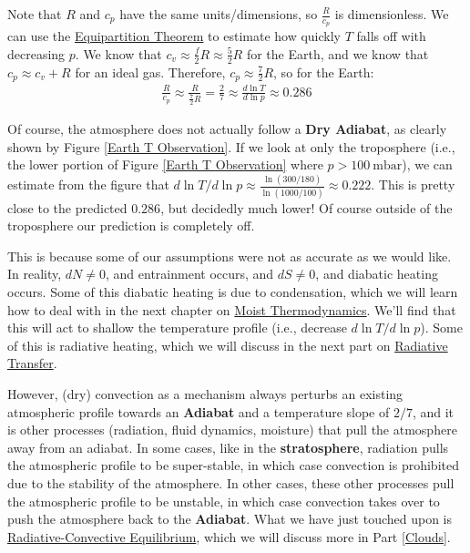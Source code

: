 Note that $R$ and $c_p$ have the same units/dimensions, so $\frac{R}{c_p}$ is dimensionless. We can use the \hyperref[Equipartition]{Equipartition Theorem} to estimate how quickly $T$ falls off with decreasing $p$. We know that $c_v\approx \frac{f}{2}R\approx\frac{5}{2}R$ for the Earth, and we know that $c_p\approx c_v+R$ for an ideal gas. Therefore, $c_p\approx \frac{7}{2}R$, so for the Earth:
\begin{align*}
    \frac{R}{c_p}\approx\frac{R}{\frac{7}{2}R}=\frac{2}{7}\approx\frac{d \ln T}{d \ln p}\approx0.286
\end{align*}

Of course, the atmosphere does not actually follow a \textbf{Dry Adiabat}, as clearly shown by Figure \ref{Earth T Observation}. If we look at only the troposphere (i.e., the lower portion of Figure \ref{Earth T Observation} where $p>\qty{100}{\milli\bar}$), we can estimate from the figure that $d\ln T/d\ln p\approx \frac{\ln(300/180)}{\ln(1000/100)}\approx 0.222$. This is pretty close to the predicted $0.286$, but decidedly much lower! Of course outside of the troposphere our prediction is completely off.

This is because some of our assumptions were not as accurate as we would like. In reality, $dN\neq0$, and entrainment occurs, and $dS\neq0$, and diabatic heating occurs. Some of this diabatic heating is due to condensation, which we will learn how to deal with in the next chapter on \hyperref[Moist Thermodynamics]{Moist Thermodynamics}. We'll find that this will act to shallow the temperature profile (i.e., decrease $d\ln T/d\ln p$). Some of this is radiative heating, which we will discuss in the next part on \hyperref[Radiative Transfer]{Radiative Transfer}.

However, (dry) convection as a mechanism always perturbs an existing atmospheric profile towards an \textbf{Adiabat} and a temperature slope of $2/7$, and it is other processes (radiation, fluid dynamics, moisture) that pull the atmosphere away from an adiabat. In some cases, like in the \textbf{stratosphere}, radiation pulls the atmospheric profile to be super-stable, in which case convection is prohibited due to the stability of the atmosphere. In other cases, these other processes pull the atmospheric profile to be unstable, in which case convection takes over to push the atmosphere back to the \textbf{Adiabat}. What we have just touched upon is \hyperref[Radiative-Convective Equilibrium]{Radiative-Convective Equilibrium}, which we will discuss more in Part \ref{Clouds}.

